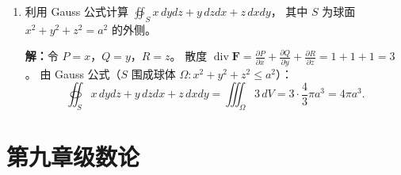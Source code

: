 \documentclass[12pt,a4paper]{ctexart}
\begin{document}
\begin{enumerate}[leftmargin=*,label=\arabic*.,start=41]
    \textbf{解：}令 $P = x^2y$，$Q = -xy^2$。
    则 $\frac{\partial Q}{\partial x} - \frac{\partial P}{\partial y} = -y^2 - x^2 = -(x^2+y^2)$。
    由 Green 公式（$L$ 围成区域 $D: x^2+y^2 \le a^2$）：
    \begin{align*}
      \oint_L (x^2y)dx - (xy^2)dy
      &= \iint_D [-(x^2+y^2)] dxdy
       = -\int_0^{2\pi} d\theta \int_0^a r^2 \cdot r dr \\
      &= -2\pi \cdot \left[\frac{r^4}{4}\right]_0^a
       = -2\pi \cdot \frac{a^4}{4}
       = -\frac{\pi a^4}{2}.
    \end{align*}

  \item 利用 Gauss 公式计算 $\displaystyle\oiint_S x\,dydz + y\,dzdx + z\,dxdy$，
    其中 $S$ 为球面 $x^2+y^2+z^2=a^2$ 的外侧。

    \textbf{解：}令 $P=x$，$Q=y$，$R=z$。
    散度 $\operatorname{div} \mathbf{F} = \frac{\partial P}{\partial x}+\frac{\partial Q}{\partial y}+\frac{\partial R}{\partial z} = 1+1+1 = 3$。
    由 Gauss 公式（$S$ 围成球体 $\Omega: x^2+y^2+z^2 \le a^2$）：
    \[
    \oiint_S x\,dydz + y\,dzdx + z\,dxdy
    = \iiint_\Omega 3 \, dV
    = 3 \cdot \frac{4}{3}\pi a^3
    = 4\pi a^3.
    \]
\end{enumerate}

\section*{第九章\quad 级数论}
\end{document}
